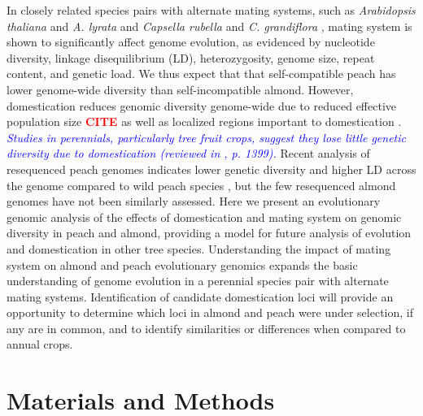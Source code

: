 \documentclass[12pt]{article}
\newcommand{\citex}{\textcolor{red}{\bf CITE }}
\newcommand{\dv}[1]{\textcolor{blue}{\emph{#1}}}
\begin{document}
In closely related species pairs with alternate mating systems, such as \emph{Arabidopsis thaliana} and \emph{A. lyrata} and \emph{Capsella rubella} and \emph{C. grandiflora} \citep{slotte2013capsella}, mating system is shown to significantly affect genome evolution, as evidenced by nucleotide diversity, linkage disequilibrium (LD), heterozygosity, genome size, repeat content, and genetic load.
%
We thus expect that that self-compatible peach has lower genome-wide diversity than self-incompatible almond.
%
However, domestication reduces genomic diversity genome-wide due to reduced effective population size \citex as well as localized regions important to domestication \citep{glemin2006impact, doebley2006molecular}. 
%
\dv{Studies in perennials, particularly tree fruit crops, suggest they lose little genetic diversity due to domestication (reviewed in \citealp{miller2011forest}, p. 1399).}
%
Recent analysis of resequenced peach genomes indicates lower genetic diversity and higher LD across the genome compared to wild peach species \citep{verde2013high}, but the few resequenced almond genomes have not been similarly assessed. 
%
Here we present an evolutionary genomic analysis of the effects of domestication and mating system on genomic diversity in peach and almond, providing a model for future analysis of evolution and domestication in other tree species.
%
Understanding the impact of mating system on almond and peach evolutionary genomics expands the basic understanding of genome evolution in a perennial species pair with alternate mating systems. 
%
Identification of candidate domestication loci will provide an opportunity to determine which loci in almond and peach were under selection, if any are in common, and to identify similarities or differences when compared to annual crops.
%
\section*{Materials and Methods}
%
\end{document}
